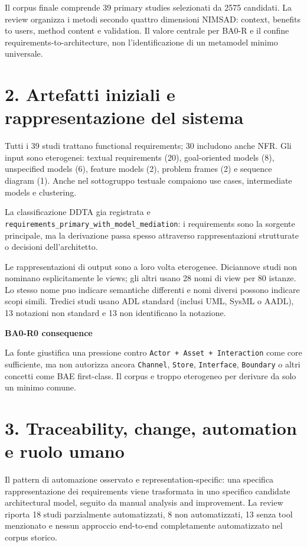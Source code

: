 \documentclass[10.5pt,a4paper]{article}
\newenvironment{cautionbox}[1]{\def\FrameCommand{\fcolorbox{ddtaorange}{ddtagray}}\MakeFramed{\advance\hsize-2\width\FrameRestore}\noindent\textbf{#1}\par\smallskip}{\endMakeFramed}
\begin{document}
Il corpus finale comprende 39 primary studies selezionati da 2575 candidati. La review organizza i metodi secondo quattro dimensioni NIMSAD: context, benefits to users, method content e validation. Il valore centrale per BA0-R e il confine requirements-to-architecture, non l'identificazione di un metamodel minimo universale.

\section{2. Artefatti iniziali e rappresentazione del sistema}
Tutti i 39 studi trattano functional requirements; 30 includono anche NFR. Gli input sono eterogenei: textual requirements (20), goal-oriented models (8), unspecified models (6), feature models (2), problem frames (2) e sequence diagram (1). Anche nel sottogruppo testuale compaiono use cases, intermediate models e clustering.

La classificazione DDTA gia registrata e \texttt{requirements\_primary\_with\_model\_mediation}: i requirements sono la sorgente principale, ma la derivazione passa spesso attraverso rappresentazioni strutturate o decisioni dell'architetto.

Le rappresentazioni di output sono a loro volta eterogenee. Diciannove studi non nominano esplicitamente le views; gli altri usano 28 nomi di view per 80 istanze. Lo stesso nome puo indicare semantiche differenti e nomi diversi possono indicare scopi simili. Tredici studi usano ADL standard (inclusi UML, SysML o AADL), 13 notazioni non standard e 13 non identificano la notazione.

\begin{cautionbox}{BA0-R0 consequence}
La fonte giustifica una pressione contro \texttt{Actor + Asset + Interaction} come core sufficiente, ma non autorizza ancora \texttt{Channel}, \texttt{Store}, \texttt{Interface}, \texttt{Boundary} o altri concetti come BAE first-class. Il corpus e troppo eterogeneo per derivare da solo un minimo comune.
\end{cautionbox}

\section{3. Traceability, change, automation e ruolo umano}
Il pattern di automazione osservato e representation-specific: una specifica rappresentazione dei requirements viene trasformata in uno specifico candidate architectural model, seguito da manual analysis and improvement. La review riporta 18 studi parzialmente automatizzati, 8 non automatizzati, 13 senza tool menzionato e nessun approccio end-to-end completamente automatizzato nel corpus storico.
\end{document}
